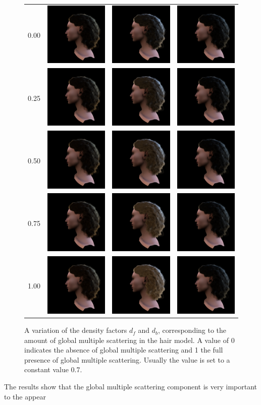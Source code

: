 \documentclass[11pt,a4paper]{report}
\begin{document}


\begin{figure}[h]
\bgroup
\setlength{\tabcolsep}{0.0em} %
\def\arraystretch{0.0}%
\begin{tabular}{cccc}
0.00 & \includegraphics[scale=0.12]{dbdf-results/brown_dbdf_0_00.png} & \includegraphics[scale=0.12]{dbdf-results/blonde_dbdf_0_00.png} & \includegraphics[scale=0.12]{dbdf-results/black_dbdf_0_00.png} \\
0.25 & \includegraphics[scale=0.12]{dbdf-results/brown_dbdf_0_25.png} & \includegraphics[scale=0.12]{dbdf-results/blonde_dbdf_0_25.png} & \includegraphics[scale=0.12]{dbdf-results/black_dbdf_0_25.png} \\
0.50 & \includegraphics[scale=0.12]{dbdf-results/brown_dbdf_0_50.png} & \includegraphics[scale=0.12]{dbdf-results/blonde_dbdf_0_50.png} & \includegraphics[scale=0.12]{dbdf-results/black_dbdf_0_50.png} \\
0.75 & \includegraphics[scale=0.12]{dbdf-results/brown_dbdf_0_75.png} & \includegraphics[scale=0.12]{dbdf-results/blonde_dbdf_0_75.png} & \includegraphics[scale=0.12]{dbdf-results/black_dbdf_0_75.png} \\
1.00 & \includegraphics[scale=0.12]{dbdf-results/brown_dbdf_1_00.png} & \includegraphics[scale=0.12]{dbdf-results/blonde_dbdf_1_00.png} & \includegraphics[scale=0.12]{dbdf-results/black_dbdf_1_00.png} \\
\end{tabular}
\egroup
\caption{A variation of the density factors $d_f$ and $d_b$, corresponding to the amount of global multiple scattering in the hair model. A value of 0 indicates the absence of global multiple scattering and 1 the full presence of global multiple scattering. Usually the value is set to a constant value 0.7.}
\label{fig_results_df}
\end{figure}

The results show that the global multiple scattering component is very important to the appear
\end{document}
